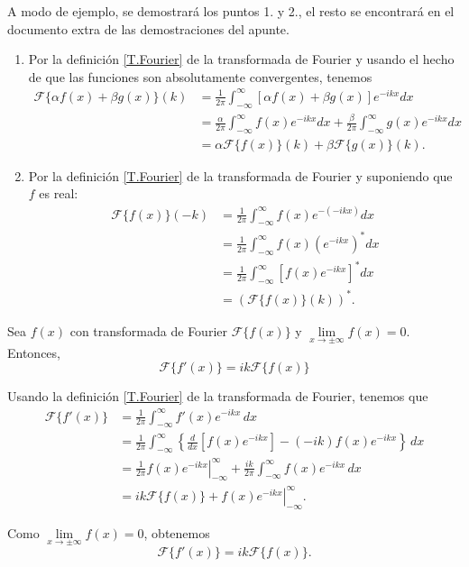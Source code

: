 \begin{demo}
A modo de ejemplo, se demostrará los puntos 1. y 2., el resto se encontrará en el documento extra de las demostraciones del apunte. 

\begin{enumerate}
    \item Por la definición \eqref{T.Fourier} de la transformada de Fourier y usando el hecho de que las funciones son absolutamente convergentes, tenemos
    \begin{align*}
        \mathcal{F}\{\alpha f(x) + \beta g(x)\}(k) &= \frac{1}{2\pi} \int_{-\infty}^{\infty} [\alpha f(x) + \beta g(x)] e^{-ikx} dx \\
        &= \frac{\alpha}{2\pi} \int_{-\infty}^{\infty}  f(x) e^{-ikx} dx + \frac{\beta}{2\pi} \int_{-\infty}^{\infty}  g(x) e^{-ikx} dx \\
        &= \alpha \mathcal{F}\{f(x)\}(k) + \beta \mathcal{F}\{g(x)\}(k).
    \end{align*}
    
    \item Por la definición \eqref{T.Fourier} de la transformada de Fourier y suponiendo que $f$ es real:
    \begin{align*}
        \mathcal{F}\{f(x)\}(-k) &= \frac{1}{2\pi} \int_{-\infty}^{\infty}  f(x)  e^{-(-ikx)} dx  \\
        &= \frac{1}{2\pi} \int_{-\infty}^{\infty}  f(x)  (e^{-ikx})^* dx  \\
        &= \frac{1}{2\pi} \int_{-\infty}^{\infty}  [f(x)  e^{-ikx}]^* dx \\
        &= (\mathcal{F}\{f(x)\}(k))^*.
    \end{align*}
\end{enumerate}
\end{demo}

\begin{propo}
Sea $f(x)$ con transformada de Fourier $\mathcal{F}\{f(x)\}$ y $\lim\limits_{x \to \pm \infty} f(x) = 0$. Entonces, 
$$\boxed{\mathcal{F}\{f'(x)\} = i k \mathcal{F}\{f(x)\}}$$
\end{propo}

\begin{demo}
Usando la definición \eqref{T.Fourier} de la transformada de Fourier, tenemos que 
\begin{align*}
    \mathcal{F}\{f'(x)\} &= \frac{1}{2\pi} \int_{- \infty}^{\infty} f'(x) e^{-ikx} \,dx \\
    &= \frac{1}{2\pi} \int_{- \infty}^{\infty} \left\{ \frac{d}{dx}\left[ f(x) e^{-ikx} \right]  - (-ik) f(x) e^{-ikx} \right\}\,dx \\
    &= \frac{1}{2\pi} \left. f(x) e^{-ikx} \right|_{-\infty}^{\infty} + \frac{ik}{2\pi} \int_{- \infty}^{\infty}  f(x) e^{-ikx} \,dx \\
    &=  ik \mathcal{F}\{f(x)\} + \left. f(x) e^{-ikx} \right|_{-\infty}^{\infty}.
\end{align*}

Como  $\lim\limits_{x \to \pm \infty} f(x) = 0$, obtenemos
$$\mathcal{F}\{f'(x)\} = i k \mathcal{F}\{f(x)\}.$$
\end{demo}

